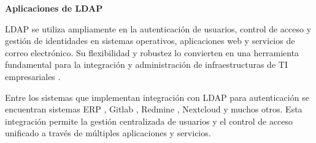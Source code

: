 \textbf{Aplicaciones de LDAP}

LDAP se utiliza ampliamente en la autenticación de usuarios, control de acceso y gestión de identidades en sistemas operativos, aplicaciones web y servicios de correo electrónico. Su flexibilidad y robustez lo convierten en una herramienta fundamental para la integración y administración de infraestructuras de TI empresariales \autocite{sermersheim_lightweight_2006,redhat_what_2022,carter_ldap_2003}.

Entre los sistemas que implementan integración con LDAP para autenticación se encuentran sistemas ERP \autocite{noauthor_setting_nodate}, Gitlab \autocite{noauthor_integrate_nodate}, Redmine \autocite{noauthor_redmineldap_nodate}, Nextcloud \autocite{noauthor_user_nodate} y muchos otros. Esta integración permite la gestión centralizada de usuarios y el control de acceso unificado a través de múltiples aplicaciones y servicios.
